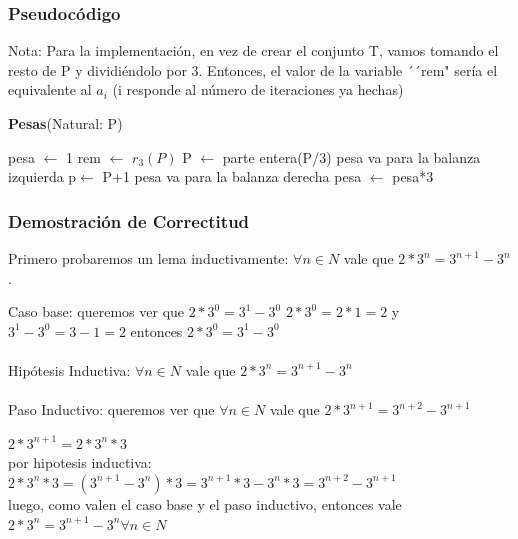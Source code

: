\documentclass[spanish,12pt]{article}
\begin{document}
\subsubsection{Pseudocódigo}

Nota: Para la implementación, en vez de crear el conjunto T, vamos tomando el resto de P y dividiéndolo por 3. Entonces, el valor de la variable ´´rem" sería el equivalente al $a_i$ (i responde al número de iteraciones ya hechas)

\begin{algorithm}[H]{\textbf{Pesas}(Natural: P)}
	\begin{algorithmic}[1]
		\State pesa $\gets$ 1
		 	\State rem $\gets$ $r_3 (P)$
	    		\State P $\gets $ parte entera(P/3)
	    			\State pesa va para la balanza izquierda    			\Else
	    				\State p$\gets$ P+1
	    				\State pesa va para la balanza derecha
				\EndIf
			\EndIf
			\State pesa $\gets$ pesa*3
		\EndWhile
	\end{algorithmic}
\end{algorithm}



\subsubsection{Demostración de Correctitud}

Primero probaremos un lema inductivamente:
$\forall n \in N$ vale que  $2*3^{n} = 3^{n+1}-3^{n}$.

Caso base:
queremos ver que $2*3^{0} = 3^{1}-3^{0}$
$2*3^0 = 2*1=2$ y $3^1-3^0= 3-1=2$ entonces $2*3^{0} = 3^{1}-3^{0}$
\\
\\
Hipótesis Inductiva:
$\forall n \in N$ vale que  $2*3^{n} = 3^{n+1}-3^{n}$
\\
\\
Paso Inductivo:
queremos ver que $\forall n \in N$ vale que  $2*3^{n+1} = 3^{n+2}-3^{n+1}$

$2*3^{n+1} = 2*3^{n}*3 $
\\
 por hipotesis inductiva: $2*3^{n}*3 = (3^{n+1}-3^{n})*3 = 3^{n+1}*3 - 3^{n}*3= 3^{n+2}-3^{n+1} $
\\
luego, como valen el caso base y el paso inductivo, entonces vale $2*3^{n} = 3^{n+1}-3^{n} \forall n \in N $
\end{document}
